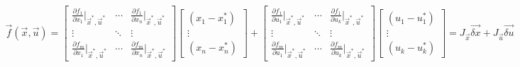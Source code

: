 \begin{align*}
    \vec{f}(\vec{x}, \vec{u}) = \begin{bmatrix}
        \frac{\partial f_1}{\partial x_1} \bigg\rvert_{\vec{x}^*, \vec{u}^*} & \cdots & \frac{\partial f_1}{\partial x_n} \bigg\rvert_{\vec{x}^*, \vec{u}^*} \\
        \vdots & \ddots & \vdots \\
        \frac{\partial f_m}{\partial x_1} \bigg\rvert_{\vec{x}^*, \vec{u}^*} & \cdots & \frac{\partial f_m}{\partial x_n} \bigg\rvert_{\vec{x}^*, \vec{u}^*}
    \end{bmatrix} \begin{bmatrix}
        (x_1 - x_1^*) \\
        \vdots \\
        (x_n - x_n^*)
    \end{bmatrix} + \begin{bmatrix}
        \frac{\partial f_1}{\partial u_1} \bigg\rvert_{\vec{x}^*, \vec{u}^*} & \cdots & \frac{\partial f_1}{\partial u_k} \bigg\rvert_{\vec{x}^*, \vec{u}^*} \\
        \vdots & \ddots & \vdots \\
        \frac{\partial f_m}{\partial u_1} \bigg\rvert_{\vec{x}^*, \vec{u}^*} & \cdots & \frac{\partial f_m}{\partial u_k} \bigg\rvert_{\vec{x}^*, \vec{u}^*}
    \end{bmatrix} \begin{bmatrix}
        (u_1 - u_1^*) \\
        \vdots \\
        (u_k - u_k^*)
    \end{bmatrix} = \boxed{J_{\vec{x}} \vec{\delta x} + J_{\vec{u}} \vec{\delta u}}
\end{align*}

